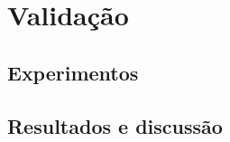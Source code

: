 \chapter{Validação}
\label{chap:validacao}

\section{Experimentos}

\section{Resultados e discussão}
